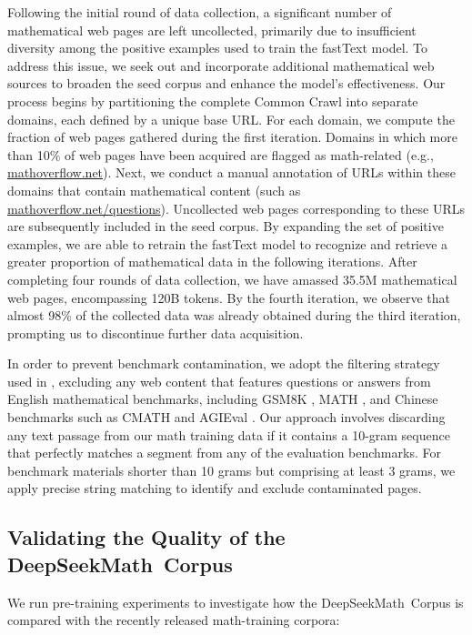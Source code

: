 \begin{itemize}[topsep=0pt]
Following the initial round of data collection, a significant number of mathematical web pages are left uncollected, primarily due to insufficient diversity among the positive examples used to train the fastText model. To address this issue, we seek out and incorporate additional mathematical web sources to broaden the seed corpus and enhance the model’s effectiveness. Our process begins by partitioning the complete Common Crawl into separate domains, each defined by a unique base URL. For each domain, we compute the fraction of web pages gathered during the first iteration. Domains in which more than 10\% of web pages have been acquired are flagged as math-related (e.g., \url{mathoverflow.net}). Next, we conduct a manual annotation of URLs within these domains that contain mathematical content (such as \url{mathoverflow.net/questions}). Uncollected web pages corresponding to these URLs are subsequently included in the seed corpus. By expanding the set of positive examples, we are able to retrain the fastText model to recognize and retrieve a greater proportion of mathematical data in the following iterations. After completing four rounds of data collection, we have amassed 35.5M mathematical web pages, encompassing 120B tokens. By the fourth iteration, we observe that almost 98\% of the collected data was already obtained during the third iteration, prompting us to discontinue further data acquisition.

In order to prevent benchmark contamination, we adopt the filtering strategy used in \cite{deepseek-coder}, excluding any web content that features questions or answers from English mathematical benchmarks, including GSM8K \citep{gsm8k}, MATH \citep{MATH}, and Chinese benchmarks such as CMATH \citep{wei2023cmath} and AGIEval \citep{agieval}. Our approach involves discarding any text passage from our math training data if it contains a 10-gram sequence that perfectly matches a segment from any of the evaluation benchmarks. For benchmark materials shorter than 10 grams but comprising at least 3 grams, we apply precise string matching to identify and exclude contaminated pages.

\subsection{Validating the Quality of the DeepSeekMath~Corpus}

We run pre-training experiments to investigate how the DeepSeekMath~Corpus is compared with the recently released math-training corpora:


\end{itemize}
